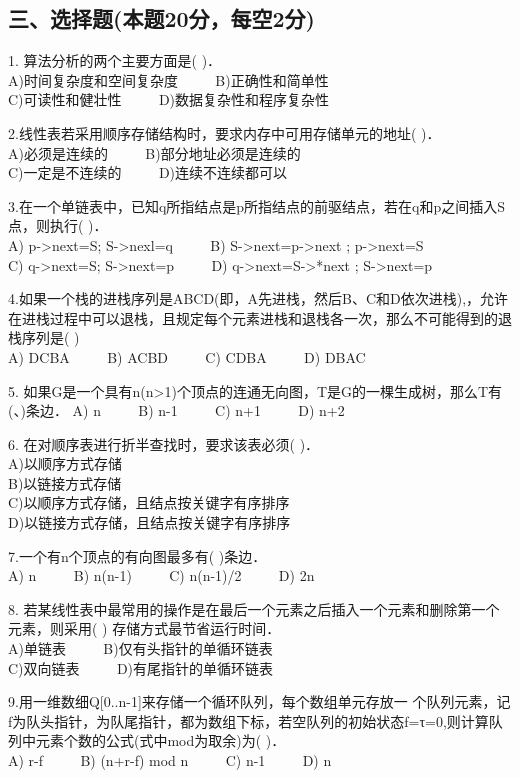 \subsection{三、选择题(本题20分，每空2分)}

1. 算法分析的两个主要方面是( )． \\
A)时间复杂度和空间复杂度 $\qquad$ B)正确性和简单性 \\
C)可读性和健壮性 $\qquad$ D)数据复杂性和程序复杂性

2.线性表若采用顺序存储结构时，要求内存中可用存储单元的地址( )． \\
A)必须是连续的 $\qquad$ B)部分地址必须是连续的 \\
C)一定是不连续的 $\qquad$ D)连续不连续都可以

3.在一个单链表中，已知q所指结点是p所指结点的前驱结点，若在q和p之间插入S点，则执行( )． \\
A) p->next=S; S->nexl=q $\qquad$ B) S->next=p->next ; p->next=S \\
C) q->next=S; S->next=p $\qquad$ D) q->next=S->*next ; S->next=p

4.如果一个栈的进栈序列是ABCD(即，A先进栈，然后B、C和D依次进栈),，允许在进栈过程中可以退栈，且规定每个元素进栈和退栈各一次，那么不可能得到的退栈序列是( ) \\
A) DCBA $\qquad$ B) ACBD $\qquad$ C) CDBA $\qquad$ D) DBAC

5. 如果G是一个具有n(n>1)个顶点的连通无向图，T是G的一棵生成树，那么T有(、)条边．
A) n $\qquad$ B) n-1 $\qquad$ C) n+1 $\qquad$ D) n+2

6. 在对顺序表进行折半查找时，要求该表必须( )． \\
A)以顺序方式存储 \\
B)以链接方式存储 \\
C)以顺序方式存储，且结点按关键字有序排序 \\
D)以链接方式存储，且结点按关键字有序排序

7.一个有n个顶点的有向图最多有( )条边． \\
A) n $\qquad$ B) n(n-1) $\qquad$ C) n(n-1)/2 $\qquad$ D) 2n

8. 若某线性表中最常用的操作是在最后一个元素之后插入一个元素和删除第一个元素，则采用( ) 存储方式最节省运行时间． \\
A)单链表 $\qquad$ B)仅有头指针的单循环链表 \\
C)双向链表 $\qquad$ D)有尾指针的单循环链表

9.用一维数细Q[0..n-1]来存储一个循环队列，每个数组单元存放一 个队列元素，记f为队头指针，为队尾指针，都为数组下标，若空队列的初始状态f=τ=0,则计算队列中元素个数的公式(式中mod为取余)为( )． \\
A) r-f $\qquad$ B) (n+r-f) mod n $\qquad$ C) n-1 $\qquad$ D) n

